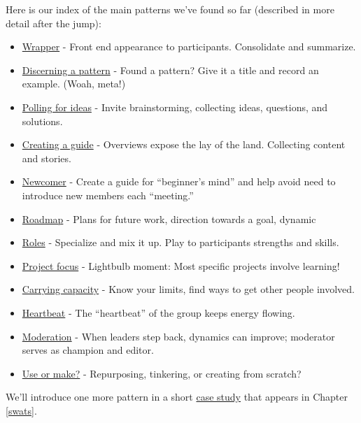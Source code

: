 Here is our index of the main patterns we've found so far (described in
more detail after the jump):

\begin{itemize}
\itemsep1pt\parskip0pt
\item
  \href{http://peeragogy.org/patterns/wrapper/}{Wrapper} - Front end
  appearance to participants. Consolidate and summarize.
\item
  \href{http://peeragogy.org/patterns/discerning-a-pattern/}{Discerning
  a pattern} - Found a pattern? Give it a title and record an example.
  (Woah, meta!)
\item
  \href{http://peeragogy.org/patterns/polling-for-ideas/}{Polling for
  ideas} - Invite brainstorming, collecting ideas, questions, and
  solutions.
\item
  \href{http://peeragogy.org/patterns/creating-a-guide/}{Creating a
  guide} - Overviews expose the lay of the land. Collecting content and
  stories.
\item
  \href{http://peeragogy.org/patterns/newcomer/}{Newcomer} - Create a
  guide for ``beginner's mind'' and help avoid need to introduce new
  members each ``meeting.''
\item
  \href{http://peeragogy.org/patterns/roadmap/}{Roadmap} - Plans for
  future work, direction towards a goal, dynamic
\item
  \href{http://peeragogy.org/patterns/roles/}{Roles} - Specialize and
  mix it up. Play to participants strengths and skills.
\item
  \href{http://peeragogy.org/focusing-on-a-specific-project/}{Project
  focus} - Lightbulb moment: Most specific projects involve learning!
\item
  \href{http://peeragogy.org/patterns/carrying-capacity/}{Carrying
  capacity} - Know your limits, find ways to get other people involved.
\item
  \href{http://peeragogy.org/patterns/heartbeat/}{Heartbeat} - The
  ``heartbeat'' of the group keeps energy flowing.
\item
  \href{http://peeragogy.org/patterns/moderation/}{Moderation} - When
  leaders step back, dynamics can improve; moderator serves as champion
  and editor.
\item
  \href{http://peeragogy.org/patterns/praxis-vs-poeisis/}{Use or make?}
  - Repurposing, tinkering, or creating from scratch?
\end{itemize}

We'll introduce one more pattern in a short
\href{http://peeragogy.org/case-study-learning-to-use-technology-with-peers-the-case-of-swats/}{case
  study} that appears in Chapter \ref{swats}.

